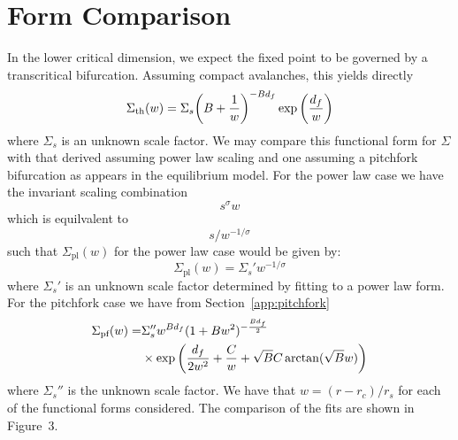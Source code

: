 \documentclass[reprint,amsmath,amssymb,aps,floatfix]{revtex4-1}
\begin{document}
\section{\label{app:compare} Form Comparison}
In the lower critical dimension, we expect the fixed point to be governed by a transcritical bifurcation. Assuming compact avalanches, this yields directly
%
\begin{equation}
	\Sigma_{\textrm{th}}(w) = \Sigma_s\bigg{(}B+\frac{1}{w}\bigg{)}^{-B d_f}\exp \bigg{(}\frac{d_f}{w}\bigg{)}
\end{equation}
%
\noindent where $\Sigma_s$ is an unknown scale factor. We may compare this functional form for $\Sigma$ with that derived assuming power law scaling and one assuming a pitchfork bifurcation as appears in the equilibrium model. For the power law case we have the invariant scaling combination
%
\begin{equation}
	s^\sigma w
\end{equation}
%
\noindent which is equilvalent to 
%
\begin{equation}
	s/w^{-1/\sigma}
\end{equation}
%
\noindent such that $\Sigma_{\textrm{pl}}(w)$ for the power law case would be given by:
%
\begin{equation}
	\Sigma_{\textrm{pl}}(w)=\Sigma_s'w^{-1/\sigma}
\end{equation}
%
\noindent where $\Sigma_s'$ is an unknown scale factor determined by fitting to a power law form. For the pitchfork case we have from Section~\ref{app:pitchfork}
%
\begin{equation}
	\begin{split}
		\Sigma_{\textrm{pf}}(w) = &\Sigma_s'' w^{B d_f}(1+B w^2)^{-\frac{B d_f}{2}} \\ 
		&\times\exp \bigg{(}\frac{d_f}{2w^2}+\frac{C}{w}+\sqrt{B} C \arctan(\sqrt{B}w)\bigg{)}
	\end{split}
\end{equation}
%
\noindent where $\Sigma_s''$ is the unknown scale factor. We have that $w=(r-r_c)/r_s$ for each of the functional forms considered. The comparison of the fits are shown in Figure~3. 
\end{document}
